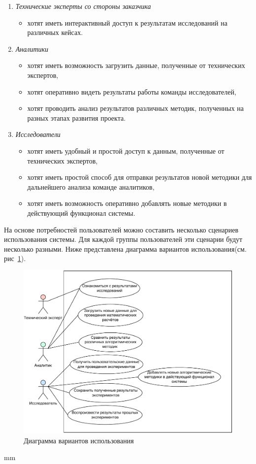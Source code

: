 \begin{enumerate}
    \item {
        \textit{Технические эксперты со стороны заказчика}
        \begin{itemize}
            \item хотят иметь интерактивный доступ к результатам исследований на различных кейсах.
        \end{itemize}
    }
    \item {
        \textit{Аналитики}
        \begin{itemize}
            \item хотят иметь возможность загрузить данные, полученные от технических экспертов,
            \item хотят оперативно видеть результаты работы команды исследователей,
            \item хотят проводить анализ результатов различных методик, полученных на разных этапах развития проекта.
        \end{itemize}
    }
    \item {
        \textit{Исследователи}
        \begin{itemize}
            \item хотят иметь удобный и простой доступ к данным, полученные от технических экспертов,
            \item хотят иметь простой способ для отправки результатов новой методики для дальнейшего анализа команде аналитиков,
            \item хотят иметь возможность оперативно добавлять новые методики в действующий функционал системы.
        \end{itemize}
    }
\end{enumerate}

На основе потребностей пользователей можно составить несколько сценариев использования системы.
Для каждой группы пользователей эти сценарии будут несколько разными.
Ниже представлена диаграмма вариантов использования(см. рис\ \ref{pic:analysis__usecases-usecase}).

\begin{figure}[H]
	\hspace*{-2.5 cm}\includegraphics[width=\textwidth, left]{analysis/pictures/usecases/usecase}
	\caption{Диаграмма вариантов использования}
	\label{pic:analysis__usecases-usecase}
\end{figure}
 mm

